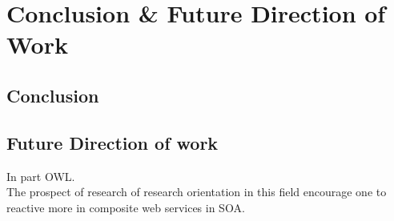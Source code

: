 \chapter{Conclusion \& Future Direction of Work}
\section{Conclusion}
  \blindtext
 
\section{Future Direction of work} In \blindtext part OWL.\\

The prospect of research of research orientation in this field  encourage one to reactive more in composite web services in SOA.

